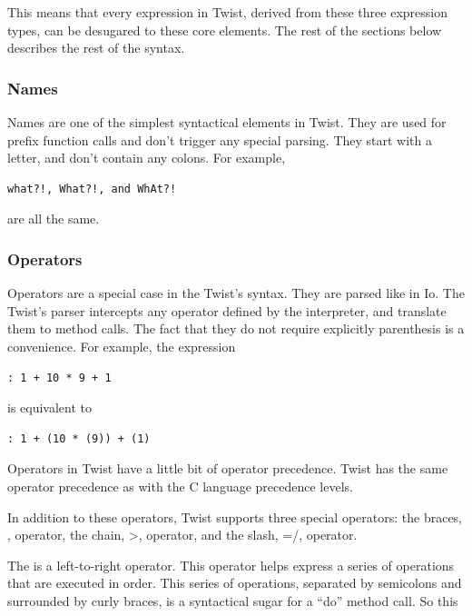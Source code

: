 This means that every expression in Twist, derived from these three expression types, can be desugared to these core elements. The rest of the sections below describes the rest of the syntax.

\subsubsection{Names}
\label{sec:names}

Names are one of the simplest syntactical elements in Twist. They are used for prefix function calls and don't trigger any special parsing. They start with a letter, and don't contain any colons. For example, 

\begin{verbatim}
what?!, What?!, and WhAt?! 
\end{verbatim} 

are all the same.

\subsubsection{Operators}
\label{sec:operators}

Operators are a special case in the Twist's syntax. They are parsed like in Io. The Twist's parser intercepts any operator defined by the interpreter, and translate them to method calls. The fact that they do not require explicitly parenthesis is a convenience. For example, the expression

\begin{verbatim}
: 1 + 10 * 9 + 1
\end{verbatim}

is equivalent to

\begin{verbatim}
: 1 + (10 * (9)) + (1)
\end{verbatim}

Operators in Twist have a little  bit of operator precedence. Twist has the same operator precedence as with the C language precedence levels.

In addition to these operators, Twist supports three special operators: the braces, {}, operator, the chain, >, operator, and the slash, =/, operator.

The {} is a left-to-right operator. This operator helps express a series of operations that are executed in order. This series of operations, separated by semicolons and surrounded by curly braces, is a syntactical sugar for a ``do'' method call. So this

